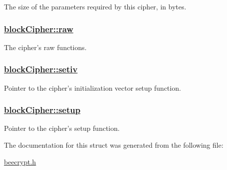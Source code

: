 The size of the parameters required by this cipher, in bytes. 

\hypertarget{structblockCipher_o8}{
\subsubsection[raw]{\setlength{\rightskip}{0pt plus 5cm}\hyperlink{structblockCipher_o8}{block\-Cipher::raw}}}
\label{structblockCipher_o8}


The cipher's raw functions. 

\hypertarget{structblockCipher_o7}{
\subsubsection[setiv]{\setlength{\rightskip}{0pt plus 5cm}\hyperlink{structblockCipher_o7}{block\-Cipher::setiv}}}
\label{structblockCipher_o7}


Pointer to the cipher's initialization vector setup function. 

\hypertarget{structblockCipher_o6}{
\subsubsection[setup]{\setlength{\rightskip}{0pt plus 5cm}\hyperlink{structblockCipher_o6}{block\-Cipher::setup}}}
\label{structblockCipher_o6}


Pointer to the cipher's setup function. 



The documentation for this struct was generated from the following file:\begin{CompactItemize}
\item 
\hyperlink{beecrypt_8h}{beecrypt.h}\end{CompactItemize}
